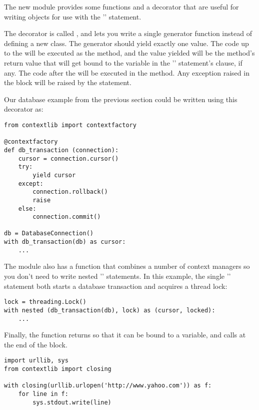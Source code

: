 \documentclass{howto}
\begin{document}
The new  module provides some functions and a
decorator that are useful for writing objects for use with the
'' statement.

The decorator is called , and lets you write
a single generator function instead of defining a new class.  The generator
should yield exactly one value.  The code up to the 
will be executed as the  method, and the value
yielded will be the method's return value that will get bound to the
variable in the '' statement's  clause, if
any.  The code after the  will be executed in the
 method.  Any exception raised in the block will be
raised by the  statement.

Our database example from the previous section could be written 
using this decorator as:

\begin{verbatim}
from contextlib import contextfactory

@contextfactory
def db_transaction (connection):
    cursor = connection.cursor()
    try:
        yield cursor
    except:
        connection.rollback()
        raise
    else:
        connection.commit()

db = DatabaseConnection()
with db_transaction(db) as cursor:
    ...
\end{verbatim}

The  module also has a  function that combines a number of context managers so you
don't need to write nested '' statements.  In this
example, the single '' statement both starts a database
transaction and acquires a thread lock:

\begin{verbatim}
lock = threading.Lock()
with nested (db_transaction(db), lock) as (cursor, locked):
    ...
\end{verbatim}

Finally, the  function
returns  so that it can be bound to a variable,
and calls  at the end of the block.

\begin{verbatim}
import urllib, sys
from contextlib import closing

with closing(urllib.urlopen('http://www.yahoo.com')) as f:
    for line in f:
        sys.stdout.write(line)
\end{verbatim}
\end{document}
